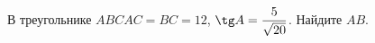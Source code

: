 \begin{ex}
	\begin{condition}
		В треугольнике \(ABC AC=BC=12 \),  \( \tg A=\dfrac{5}{\sqrt{20}} \).  Найдите \( AB \).
	\end{condition}
\end{ex}
